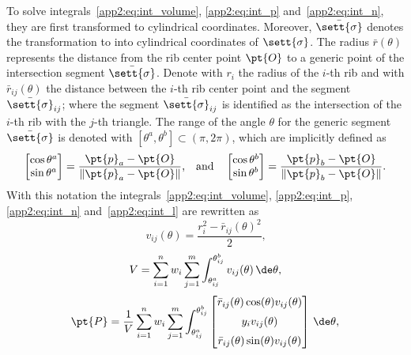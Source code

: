 To solve integrals~\eqref{app2:eq:int_volume}, \eqref{app2:eq:int_p} and~\eqref{app2:eq:int_n}, they are first transformed to cylindrical coordinates. Moreover, $\bar{\sett{\sigma}}$ denotes the transformation to into cylindrical coordinates of $\sett{\sigma}$. The radius $\bar{r}(\theta)$ represents the distance from the rib center point $\pt{O}$ to a generic point of the intersection segment $\bar{\sett{\sigma}}$. Denote with $r_i$ the radius of the $i$-th rib and with $\bar{r}_{ij}(\theta)$ the distance between the $i$-th rib center point and the segment $\bar{\sett{\sigma}}_{ij}$; where the segment $\bar{\sett{\sigma}}_{ij}$ is identified as the intersection of the $i$-th rib with the $j$-th triangle. The range of the angle $\theta$ for the generic segment $\bar{\sett{\sigma}}$ is denoted with $[\theta^a,\theta^b]\subset (\pi,2\pi)$, which are implicitly defined as
%
\begin{equation*}
  \begin{bmatrix} \cos \theta^a \\ \sin \theta^a \end{bmatrix}=
  \dfrac{\pt{p}_a - \pt{O}}{\|\pt{p}_a - \pt{O}\|}
  \text{,} \quad \text{and} \quad
  \begin{bmatrix} \cos \theta^b \\ \sin \theta^b \end{bmatrix}=
  \dfrac{\pt{p}_b - \pt{O}}{\|\pt{p}_b - \pt{O}\|}
  \text{.}
\end{equation*}
%
With this notation the integrals~\eqref{app2:eq:int_volume}, \eqref{app2:eq:int_p}, \eqref{app2:eq:int_n} and~\eqref{app2:eq:int_l} are rewritten as
%
\begin{equation}
  v_{ij}(\theta) = \dfrac{r_i^2-\bar{r}_{ij}(\theta)^2}{2}
  \text{,}
  \label{app2:eq:int_v_ij}
\end{equation}
%
\begin{equation}
  V = \sum_{i=1}^{n}w_i \sum_{j=1}^{m} \int_{\theta^a_{ij}}^{\theta^b_{ij}} v_{ij}(\theta) \, \de\theta
  \text{,}
  \label{app2:eq:int_v_cyl}
\end{equation}
%
\begin{equation}
  \pt{P} =
    \dfrac{1}{V} \sum_{i=1}^{n}w_i\sum_{j=1}^{m} \displaystyle\int_{\theta^a_{ij}}^{\theta^b_{ij}}
  \begin{bmatrix}
    \bar{r}_{ij}(\theta)\cos(\theta)v_{ij}(\theta)
    \\[2mm]
    y_i v_{ij}(\theta)
    \\[2mm]
    \bar{r}_{ij}(\theta)\sin(\theta)v_{ij}(\theta)
  \end{bmatrix} \, \de\theta
  \text{,}
  \label{app2:eq:int_p_cyl}
\end{equation}

